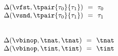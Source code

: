 \begin{flushleft}
\medskip
\begin{minipage}[t]{0.5\columnwidth}
\fbox{$\Delta(\vunop, \tau) = \tau$}\\
$\begin{array}{l@{~~}c@{~~}l}
  \Delta(\vfst, \tpair{\tau_0}{\tau_1}) & = & \tau_0
\\
  \Delta(\vsnd, \tpair{\tau_0}{\tau_1}) & = & \tau_1
\end{array}$
\end{minipage}%
\begin{minipage}[t]{0.5\columnwidth}
\fbox{$\Delta(\vbinop, \tau, \tau) = \tau$}\\
$\begin{array}{l@{~~}c@{~~}l}
  \Delta(\vbinop, \tnat, \tnat) & = & \tnat
\\
  \Delta(\vbinop, \tint, \tint) & = & \tint
\end{array}$
\end{minipage}

\medskip
{}
\begin{mathpar}








\end{mathpar}
\end{flushleft}
